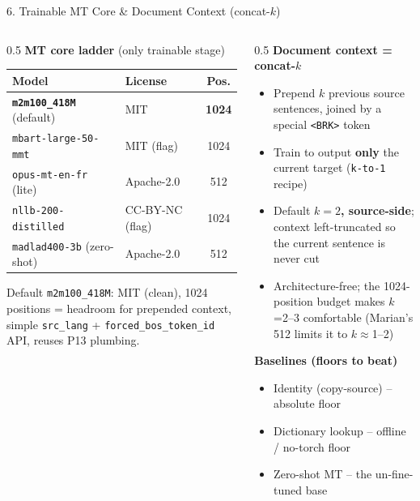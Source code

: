 \documentclass[10pt,aspectratio=169]{beamer}
\begin{document}
\begin{frame}{6. Trainable MT Core \& Document Context (concat-$k$)}
\begin{columns}[T]
\begin{column}{0.5\textwidth}
\textbf{MT core ladder} (only trainable stage)
\begin{table}[h]
\centering\scriptsize
\begin{tabular}{llc}
\toprule
\textbf{Model} & \textbf{License} & \textbf{Pos.} \\
\midrule
\textbf{\texttt{m2m100\_418M}} (default) & MIT & \textbf{1024} \\
\texttt{mbart-large-50-mmt} & MIT (flag) & 1024 \\
\texttt{opus-mt-en-fr} (lite) & Apache-2.0 & 512 \\
\texttt{nllb-200-distilled} & CC-BY-NC (flag) & 1024 \\
\texttt{madlad400-3b} (zero-shot) & Apache-2.0 & 512 \\
\bottomrule
\end{tabular}
\end{table}
\scriptsize Default \texttt{m2m100\_418M}: MIT (clean), 1024 positions = headroom for prepended context, simple \texttt{src\_lang} + \texttt{forced\_bos\_token\_id} API, reuses P13 plumbing.
\end{column}
\begin{column}{0.5\textwidth}
\textbf{Document context = concat-$k$}
\begin{itemize}\small
  \item Prepend $k$ previous source sentences, joined by a special \texttt{<BRK>} token
  \item Train to output \textbf{only} the current target (\texttt{k-to-1} recipe)
  \item Default \textbf{$k=2$, source-side}; context left-truncated so the current sentence is never cut
  \item Architecture-free; the 1024-position budget makes $k$=2--3 comfortable (Marian's 512 limits it to $k\approx$1--2)
\end{itemize}

\textbf{Baselines (floors to beat)}
\begin{itemize}\small
  \item Identity (copy-source) -- absolute floor
  \item Dictionary lookup -- offline / no-torch floor
  \item Zero-shot MT -- the un-fine-tuned base
\end{itemize}
\end{column}
\end{columns}
\end{frame}
\end{document}
